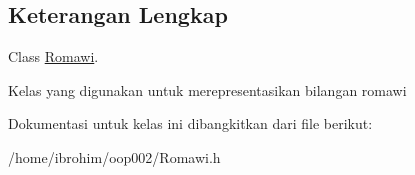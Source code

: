 \subsection{Keterangan Lengkap}
Class \hyperlink{classRomawi}{Romawi}. 

Kelas yang digunakan untuk merepresentasikan bilangan romawi 

Dokumentasi untuk kelas ini dibangkitkan dari file berikut\+:\begin{DoxyCompactItemize}
\item 
/home/ibrohim/oop002/Romawi.\+h\end{DoxyCompactItemize}

